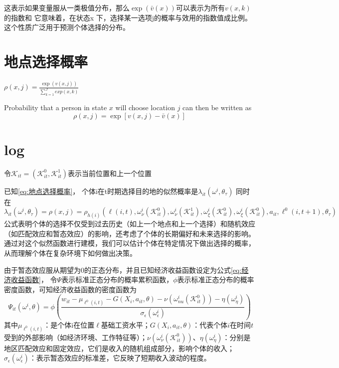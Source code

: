 \documentclass[a4paper, zihao=-4, fontset = mac, oneside]{ctexbook} %
\begin{document}
这表示如果变量服从一类极值分布，那么$\exp\left(\bar{v}(x)\right)$可以表示为所有$v(x, k)$的指数和
它意味着，在状态x 下，选择某一选项j的概率与效用的指数值成比例。
这个性质广泛用于预测个体选择的分布。

\chapter{地点选择概率}
$\rho(x,j)=\frac{\exp(v(x,j))}{\sum\limits_{k=1}^{J} exp(x,k)}$

Probability that a person in state $x$ will choose location $j$ can then be written as
$$\rho(x,j)=\exp[v(x,j)-\bar v(x)]$$

\chapter{log} %

令$\mathcal{K}_{it}=(\mathcal{K}_{it}^{0},\mathcal{K}_{it}^{1})$表示当前位置和上一个位置

已知\ref{eq:地点选择概率}，
个体i在t时期选择目的地的似然概率是$\lambda_{it}(\omega^{i},\theta_{\tau})$
同时在
\begin{equation}
  \lambda_{it}(\omega^{i},\theta_{\tau})=\rho(x,j)=\rho_{h(i)}(\ell(i,t),\omega_{\nu}^{i}(\mathcal{K}_{it}^{0}),\omega_{\nu}^{i}(\mathcal{K}_{it}^{1}),\omega_{\xi}^{i}(\mathcal{K}_{it}^{0}),\omega_{\xi}^{i}(\mathcal{K}_{it}^{0}),a_{it},\ell^{0}(i,t+1),\theta_{\tau})
\end{equation}
公式表明个体的选择不仅受到过去历史（如上一个地点和上一个选择）和随机效应（如匹配效应和暂态效应）的影响，还考虑了个体的长期偏好和未来选择的影响。
通过对这个似然函数进行建模，我们可以估计个体在特定情况下做出选择的概率，从而理解个体在复杂环境下如何做出决策。


由于暂态效应服从期望为$0$的正态分布，并且已知经济收益函数设定为公式\ref{eq:经济收益函数}，
令$\Psi$表示标准正态分布的概率累积函数，$\phi$表示标准正态分布的概率密度函数，可知经济收益函数的密度函数为
\begin{equation}
  \Psi_{it}(\omega^{i},\theta)=\phi(\frac{w_{it} - \mu_{\ell^{0}(i,t)}-G(X_{i},a_{it},\theta)-\nu(\omega_{nu}^{i}(\mathcal{K}_{it}^{0}))-\eta(\omega_{\eta}^{i})  }{\sigma_{\epsilon}(\omega_{\epsilon}^{i})})
\end{equation}
其中$\mu_{\ell^{0}(i,t)}$：是个体i在位置$\ell$基础工资水平；$G(X_i, a_{it}, \theta)$：代表个体$i$在时间$t$受到的外部影响（如经济环境、工作特征等）；$\nu(\omega_{\nu}^i(\mathcal{K}_{it}^0))$、$\eta(\omega_{\eta}^i)$：分别是地区匹配效应和固定效应，它们是收入的随机组成部分，影响个体的收入；$\sigma_{\epsilon}(\omega_{\epsilon}^i)$：表示暂态效应的标准差，它反映了短期收入波动的程度。
\end{document}
